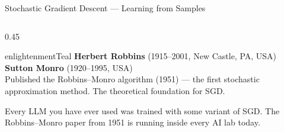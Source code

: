 \begin{frame}[shrink=8]{Stochastic Gradient Descent --- Learning from Samples}

  \begin{columns}[T]
    \begin{column}{0.45\textwidth}
      \begin{personbox}{enlightenmentTeal}
        \small
        \textbf{Herbert Robbins} (1915--2001, New Castle, PA, USA)\\
        \textbf{Sutton Monro} (1920--1995, USA)\\[3pt]
        Published the Robbins--Monro algorithm (1951) --- the first
        stochastic approximation method.
        The theoretical foundation for SGD.
      \end{personbox}

      \vspace{0.5em}
      \begin{insightbox}
        Every LLM you have ever used was trained with some variant of SGD.
        The Robbins--Monro paper from 1951 is running inside every AI lab today.
      \end{insightbox}
    \end{column}


\end{columns}
\end{frame}
